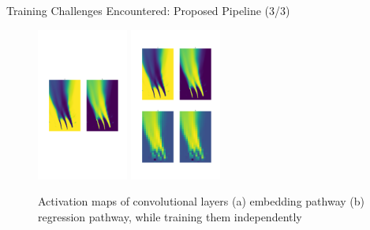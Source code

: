 \documentclass[aspectratio=169]{beamer}
\begin{document}
\begin{frame}{Training Challenges Encountered: Proposed Pipeline (3/3)}

\begin{figure}[h]
      
        \centering
        \includegraphics[width=0.4\linewidth, height=5cm]{images/activation_embedding.png} 
        \includegraphics[width=0.4\linewidth,height=5cm]{images/activation_regression.png}
        \caption{Activation maps of convolutional layers (a) embedding pathway (b) regression pathway, while training them independently}
        \end{figure}
\end{frame}
\end{document}

